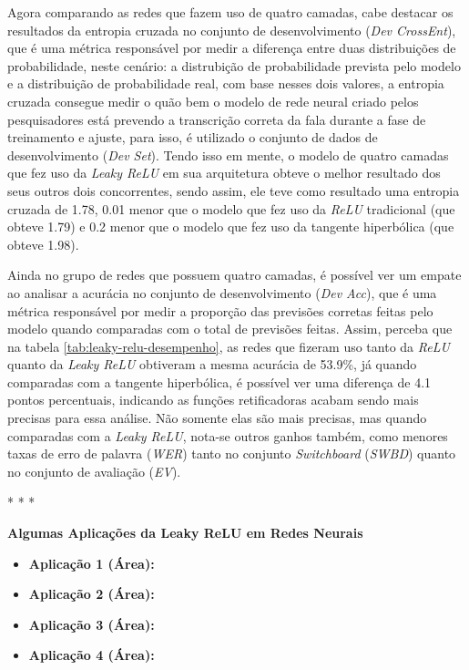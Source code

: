 \begin{table}[ht]
\begin{threeparttable}
    \end{threeparttable}
\end{table}

Agora comparando as redes que fazem uso de quatro camadas, cabe destacar os resultados da entropia cruzada no conjunto de desenvolvimento (\textit{Dev CrossEnt}), que é uma métrica responsável por medir a diferença entre duas distribuições de probabilidade, neste cenário: a distrubição de probabilidade prevista pelo modelo e a distribuição de probabilidade real, com base nesses dois valores, a entropia cruzada consegue medir o quão bem o modelo de rede neural criado pelos pesquisadores está prevendo a transcrição correta da fala durante a fase de treinamento e ajuste, para isso, é utilizado o conjunto de dados de desenvolvimento (\textit{Dev Set}). Tendo isso em mente, o modelo de quatro camadas que fez uso da \textit{Leaky ReLU} em sua arquitetura obteve o melhor resultado dos seus outros dois concorrentes, sendo assim, ele teve como resultado uma entropia cruzada de 1.78, 0.01 menor que o modelo que fez uso da \textit{ReLU} tradicional (que obteve 1.79) e 0.2 menor que o modelo que fez uso da tangente hiperbólica (que obteve 1.98).

Ainda no grupo de redes que possuem quatro camadas, é possível ver um empate ao analisar a acurácia no conjunto de desenvolvimento (\textit{Dev Acc}), que é uma métrica responsável por medir a proporção das previsões corretas feitas pelo modelo quando comparadas com o total de previsões feitas. Assim, perceba que na tabela \ref{tab:leaky-relu-desempenho}, as redes que fizeram uso tanto da \textit{ReLU} quanto da \textit{Leaky ReLU} obtiveram a mesma acurácia de 53.9\%, já quando comparadas com a tangente hiperbólica, é possível ver uma diferença de 4.1 pontos percentuais, indicando as funções retificadoras acabam sendo mais precisas para essa análise. Não somente elas são mais precisas, mas quando comparadas com a \textit{Leaky ReLU}, nota-se outros ganhos também, como menores taxas de erro de palavra (\textit{WER}) tanto no conjunto \textit{Switchboard} (\textit{SWBD}) quanto no conjunto de avaliação (\textit{EV}).

\medskip
\begin{center}
 * * *
\end{center}
\medskip

\textbf{Algumas Aplicações da Leaky ReLU em Redes Neurais}
\vspace{1em}

\begin{itemize}
    \item \textbf{Aplicação 1 (Área):}
    \item \textbf{Aplicação 2 (Área):}
    \item \textbf{Aplicação 3 (Área):}
    \item \textbf{Aplicação 4 (Área):}
\end{itemize}

